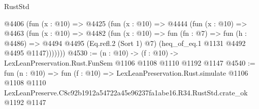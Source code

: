 \begin{lexlean}{RustStd}
\begin{coremodule}
    @4406
      (fun (x : @10) =>
      @4425
        (fun (x : @10) =>
        @4444
          (fun (x : @10) =>
          @4463
            (fun (x : @10) =>
            @4482
              (fun (x : @10) =>
              fun (fn : @7) =>
              fun (h : @4486) =>
              @4494 @4495 (Eq.refl.{2} (Sort 1) @7) (heq_of_eq.{1} @1131 @4492 @4495 @1147)))))))
@4530 := (n : @10) -> (f : @10) -> LexLeanPreservation.Rust.FunSem @1106 @1108 @1110 @1192 @1147
@4540 := fun (n : @10) =>
  fun (f : @10) =>
  LexLeanPreservation.Rust.simulate
    @1106
    @1108
    @1110
    LexLeanPreserve.C8c92b1912a54722a45e96237fa1abe16.R34.RustStd.crate_ok
    @1192
    @1147
\end{coremodule}
\end{lexlean}
